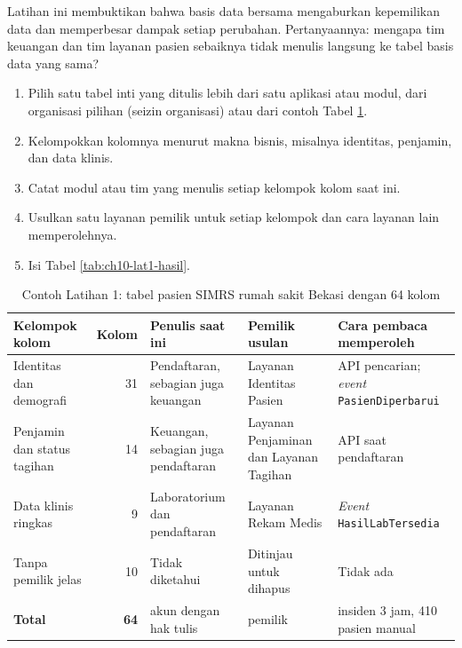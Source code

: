 Latihan ini membuktikan bahwa basis data bersama mengaburkan kepemilikan data dan memperbesar dampak
setiap perubahan. Pertanyaannya: mengapa tim keuangan dan tim layanan pasien sebaiknya tidak menulis
langsung ke tabel basis data yang sama?

\begin{enumerate}
  \item Pilih satu tabel inti yang ditulis lebih dari satu aplikasi atau modul, dari organisasi
        pilihan (seizin organisasi) atau dari contoh Tabel \ref{tab:ch10-lat1-contoh}.
  \item Kelompokkan kolomnya menurut makna bisnis, misalnya identitas, penjamin, dan data klinis.
  \item Catat modul atau tim yang menulis setiap kelompok kolom saat ini.
  \item Usulkan satu layanan pemilik untuk setiap kelompok dan cara layanan lain memperolehnya.
  \item Isi Tabel \ref{tab:ch10-lat1-hasil}.
\end{enumerate}

\begin{table}[!htb]
  \centering
  \caption{Contoh Latihan 1: tabel pasien SIMRS rumah sakit Bekasi dengan 64 kolom}
  \label{tab:ch10-lat1-contoh}
  \footnotesize
  \begin{tabularx}{\textwidth}{>{\raggedright\arraybackslash}p{2.1cm} r >{\raggedright\arraybackslash}p{2.5cm} >{\raggedright\arraybackslash}p{2.4cm} >{\raggedright\arraybackslash}X}
    \hline
    \textbf{Kelompok kolom} & \textbf{Kolom} & \textbf{Penulis saat ini} & \textbf{Pemilik usulan} &
      \textbf{Cara pembaca memperoleh} \\ \hline
    Identitas dan demografi & 31 & Pendaftaran, sebagian juga keuangan & Layanan Identitas Pasien &
      API pencarian; \textit{event} \texttt{PasienDiperbarui} \\ \hline
    Penjamin dan status tagihan & 14 & Keuangan, sebagian juga pendaftaran & Layanan Penjaminan dan
      Layanan Tagihan & API saat pendaftaran \\ \hline
    Data klinis ringkas & 9 & Laboratorium dan pendaftaran & Layanan Rekam Medis & \textit{Event}
      \texttt{HasilLabTersedia} \\ \hline
    Tanpa pemilik jelas & 10 & Tidak diketahui & Ditinjau untuk dihapus & Tidak ada \\ \hline
    \textbf{Total} & \textbf{64} & 23 akun dengan hak tulis & 4 pemilik & 1 insiden 3 jam, 410
      pasien manual \\ \hline
  \end{tabularx}
\end{table}

